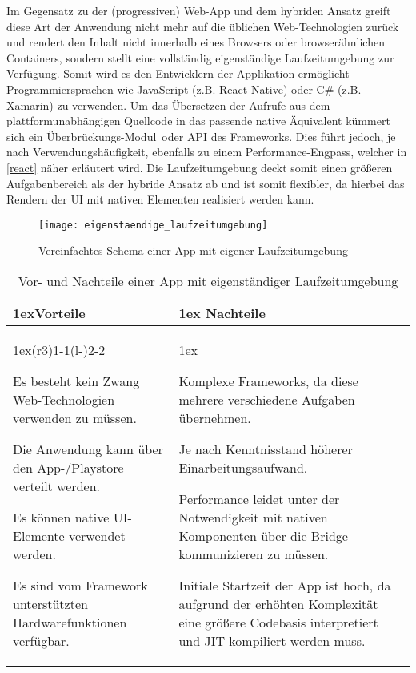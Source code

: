 Im Gegensatz zu der (progressiven) Web-App und dem hybriden Ansatz greift diese Art der Anwendung nicht mehr auf die üblichen Web-Technologien zurück und rendert den Inhalt nicht innerhalb eines Browsers oder browserähnlichen Containers, sondern stellt eine vollständig eigenständige Laufzeitumgebung zur Verfügung. Somit wird es den Entwicklern der Applikation ermöglicht Programmiersprachen wie JavaScript (z.B. React Native) oder C\# (z.B. Xamarin) zu verwenden. Um das Übersetzen der Aufrufe aus dem plattformunabhängigen Quellcode in das passende native Äquivalent kümmert sich ein \grqq Überbrückungs-Modul\grqq\ oder \ac{API} des Frameworks. Dies führt jedoch, je nach Verwendungshäufigkeit, ebenfalls zu einem Performance-Engpass, welcher in \foreignlanguage{ngerman}{\cref{react}} näher erläutert wird. Die Laufzeitumgebung deckt somit einen größeren Aufgabenbereich als der hybride Ansatz ab und ist somit flexibler, da hierbei das Rendern der \ac{UI} mit nativen Elementen realisiert werden kann.\cite{hansen_performance_overhead_cross_platform}


\begin{figure}[!h]
	\texttt{[image: eigenstaendige\_laufzeitumgebung]}
	\centering
	\caption{Vereinfachtes Schema einer App mit eigener Laufzeitumgebung}
\end{figure}


\begin{table}[h]
	\begin{tabularx}{\linewidth}{>{\parskip1ex}X@{\kern4\tabcolsep}>{\parskip1ex}X}
		\toprule
		\hfil\bfseries Vorteile
		&
		\hfil\bfseries Nachteile
		\\\cmidrule(r{3\tabcolsep}){1-1}\cmidrule(l{-\tabcolsep}){2-2}
		
		Es besteht kein Zwang Web-Technologien verwenden zu müssen.\par
		Die Anwendung kann über den App-/Playstore verteilt werden.\par
		Es können native \ac{UI}-Elemente verwendet werden.\par
		Es sind vom Framework unterstützten Hardwarefunktionen verfügbar.\par
		
		&
		
		Komplexe Frameworks, da diese mehrere verschiedene Aufgaben übernehmen.\par
		Je nach Kenntnisstand höherer Einarbeitungsaufwand.\par
		Performance leidet unter der Notwendigkeit mit nativen Komponenten über die Bridge kommunizieren zu müssen.\par
		Initiale Startzeit der App ist hoch, da aufgrund der erhöhten Komplexität eine größere Codebasis interpretiert und \ac{JIT} kompiliert werden muss.\par
		\\\bottomrule
	\end{tabularx}
	\caption{Vor- und Nachteile einer App mit eigenständiger Laufzeitumgebung}
\end{table}

